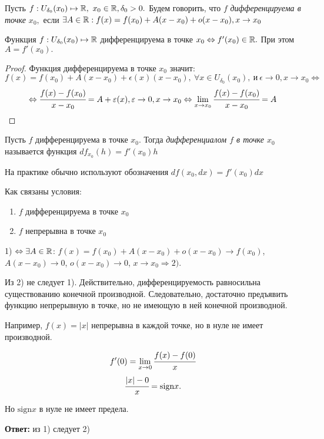 \begin{definition}
    Пусть $f: U_{\delta_{0}}(x_{0}) \mapsto \R, \ x_{0} \in \R, \delta_{0} > 0.$ Будем говорить, что $f$ \textit{дифференцируема в точке $x_{0},$} если $\exists A \in \R: f(x) = f(x_{0}) + A(x-x_{0}) + o(x-x_{0}), x\to x_{0}$
\end{definition}

\begin{theorem}
    Функция $f: U_{\delta_{0}}(x_{0}) \mapsto \R$ дифференцируема в точке $x_{0} \Leftrightarrow f'(x_{0}) \in \R.$ При этом $A = f'(x_{0}).$
\end{theorem}
\begin{proof}
    Функция дифференцируема в точке $x_{0}$ значит:
    $$  f(x) = f(x_{0}) + A(x-x_{0}) + \epsilon(x)(x-x_{0}), \ \forall x \in U_{\delta_{0}}(x_{0}), \ \textrm{и} \ \epsilon \to 0, x \to x_{0} \Leftrightarrow$$
    $$
    \Leftrightarrow \cfrac{f(x)- f(x_{0})}{x - x_{0}} = A  + \epsilon(x), \epsilon \to 0, x \to x_{0} \Leftrightarrow  \lim\limits_{x \to x_{0}} \cfrac{f(x)- f(x_{0})}{x - x_{0}} = A$$
\end{proof}

\begin{definition}
    Пусть $f$ дифференцируема в точке $x_{0}$. Тогда \textit{дифференциалом $f$ в точке $x_{0}$} называется функция $df_{x_{0}}(h) = f'(x_{0})h$

    На практике обычно используют обозначения $df(x_{0}, dx) = f'(x_{0})dx$
\end{definition}

\begin{problem}
    Как связаны условия:
    \begin{enumerate}
        \item $f$ дифференцируема в точке $x_{0}$
        \item $f$ непрерывна в точке $x_{0}$
    \end{enumerate}
\end{problem}
\begin{solution}
    1) $\Leftrightarrow \exists A \in \R$: $f(x) = f(x_{0}) + A(x-x_{0}) + o(x-x_{0}) \to f(x_{0})$, $ A(x-x_{0}) \to 0$, $o(x-x_{0}) \to 0$, $x\to x_{0} \Rightarrow 2)$.

    Из 2) не следует 1). Действительно, дифференцируемость равносильна существованию конечной производной. Следовательно, достаточно предъявить функцию непрерывную в точке, но не имеющую в ней конечной производной. 
    
    Например, $f(x) = |x|$ непрерывна в каждой точке, но в нуле не имеет производной.

    $$f'(0) = \lim\limits_{x\to 0} \cfrac{f(x) - f(0)}{x}$$
    $$
    \cfrac{|x| - 0}{x} = \text{sign}x.$$

    Но $\text{sign}x$ в нуле не имеет предела.
    
     \textbf{Ответ:} из 1) следует 2)
\end{solution}